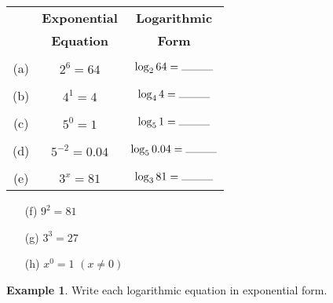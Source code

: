 \documentclass{report}
\theoremstyle{definition}
\newtheorem{example}{\bf Example}
\begin{document}
\begin{minipage}[t]{0.45\linewidth}
 	\begin{tabular}[t]{c|c|c|}
 	\cline{2-3}
 	& \textbf{Exponential} & \textbf{Logarithmic}\\
 	& \textbf{Equation} & \textbf{Form}\\
 	\cline{2-3}
 	&&\\
 	(a) & $2^6=64$ & $\log_2 64 = \rule{1cm}{0.01cm}$\\
 	\cline{2-3}
 	&&\\
 	(b) & $4^1=4$ & $\log_4 4 = \rule{1cm}{0.01cm}$ \\
 	\cline{2-3}	 
 	&&\\
 	(c) & $5^0=1$ & $\log_5 1 = \rule{1cm}{0.01cm}$ \\
 	\cline{2-3}
 	&&\\
 	(d) & $5^{-2}=0.04$ & $\log_5 0.04 = \rule{1cm}{0.01cm}$ \\
 	\cline{2-3}
 	&&\\
 	(e) & $3^x=81$ & $\log_3 81 = \rule{1cm}{0.01cm}$ \\	
 	\cline{2-3}
 	\end{tabular}
\end{minipage}
\hspace{1.25cm}
 \begin{minipage}[t]{0.45\linewidth}
 	\vspace{0.5cm}
	 \begin{itemize}
	 	\item[(f)] $9^2=81$\\
	 	\vspace{0.5cm}
	 	\item[(g)] $3^3=27$ \\
		\vspace{0.5cm}
	 	\item[(h)] $x^0=1 \,\, (x\neq 0)$ \\
	 	\vspace{0.5cm}
	 \end{itemize}
\end{minipage}

\vfill

\begin{example}
Write each logarithmic equation in exponential form.
\end{example}
 
\end{document}
